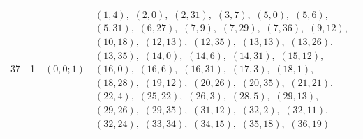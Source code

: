 \documentclass[11pt]{article}
\begin{document}
\begin{longtable}{@{}rrl>{\raggedright\arraybackslash}p{}@{}}
37 & 1 & $(0,0;1)$ & $(1,4)$,\allowbreak\ $(2,0)$,\allowbreak\ $(2,31)$,\allowbreak\ $(3,7)$,\allowbreak\ $(5,0)$,\allowbreak\ $(5,6)$,\allowbreak\ $(5,31)$,\allowbreak\ $(6,27)$,\allowbreak\ $(7,9)$,\allowbreak\ $(7,29)$,\allowbreak\ $(7,36)$,\allowbreak\ $(9,12)$,\allowbreak\ $(10,18)$,\allowbreak\ $(12,13)$,\allowbreak\ $(12,35)$,\allowbreak\ $(13,13)$,\allowbreak\ $(13,26)$,\allowbreak\ $(13,35)$,\allowbreak\ $(14,0)$,\allowbreak\ $(14,6)$,\allowbreak\ $(14,31)$,\allowbreak\ $(15,12)$,\allowbreak\ $(16,0)$,\allowbreak\ $(16,6)$,\allowbreak\ $(16,31)$,\allowbreak\ $(17,3)$,\allowbreak\ $(18,1)$,\allowbreak\ $(18,28)$,\allowbreak\ $(19,12)$,\allowbreak\ $(20,26)$,\allowbreak\ $(20,35)$,\allowbreak\ $(21,21)$,\allowbreak\ $(22,4)$,\allowbreak\ $(25,22)$,\allowbreak\ $(26,3)$,\allowbreak\ $(28,5)$,\allowbreak\ $(29,13)$,\allowbreak\ $(29,26)$,\allowbreak\ $(29,35)$,\allowbreak\ $(31,12)$,\allowbreak\ $(32,2)$,\allowbreak\ $(32,11)$,\allowbreak\ $(32,24)$,\allowbreak\ $(33,34)$,\allowbreak\ $(34,15)$,\allowbreak\ $(35,18)$,\allowbreak\ $(36,19)$\\

\end{longtable}
\end{document}
